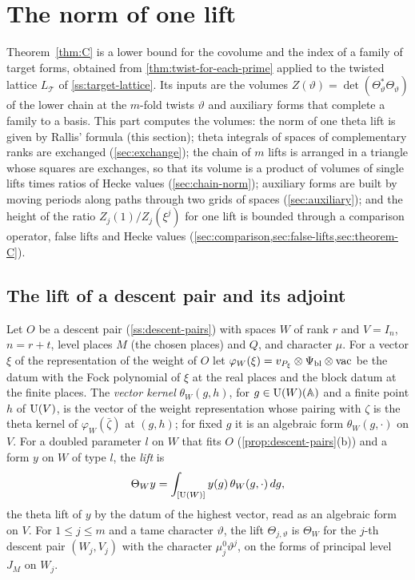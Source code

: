 \section{The norm of one lift}\label{sec:one-lift-norm}

Theorem~\ref{thm:C} is a lower bound for the covolume and the index of a family of target forms, obtained from \cref{thm:twist-for-each-prime} applied to
the twisted lattice $L_{\mathcal T}$ of \cref{ss:target-lattice}. Its inputs are the volumes $Z(\vartheta)=\det(\Theta_\vartheta^*\Theta_\vartheta)$ of the lower chain at the
$m$-fold twists $\vartheta$ and auxiliary forms that complete a family to a basis. This part computes the volumes: the norm of one theta lift is given by
Rallis' formula (this section); theta integrals of spaces of complementary ranks are exchanged (\cref{sec:exchange}); the chain of $m$ lifts is
arranged in a triangle whose squares are exchanges, so that its volume is a product of volumes of single lifts times ratios of Hecke values
(\cref{sec:chain-norm}); auxiliary forms are built by moving periods along paths through two grids of spaces (\cref{sec:auxiliary}); and the height of
the ratio $Z_j(1)/Z_j(\xi^j)$ for one lift is bounded through a comparison operator, false lifts and Hecke values
(\cref{sec:comparison,sec:false-lifts,sec:theorem-C}).

\subsection{The lift of a descent pair and its adjoint}\label{ss:lift-adjoint}
Let $O$ be a descent pair (\cref{ss:descent-pairs}) with spaces $W$ of rank $r$ and $V=I_n$, $n=r+t$, level places $M$ (the chosen places) and $Q$, and
character $\mu$. For a vector $\xi$ of the representation of the weight of $O$ let $\varphi_W(\xi)=v_{P_\xi}\otimes\Psi_{\rm bl}\otimes\mathrm{vac}$ be the datum with the Fock
polynomial of $\xi$ at the real places and the block datum at the finite places. The \emph{vector kernel} $\theta_W(g,h)$, for $g\in\operatorname{U}(W)(\mathbb{A})$ and a finite
point $h$ of $\operatorname{U}(V)$, is the vector of the weight representation whose pairing with $\zeta$ is the theta kernel of $\varphi_W(\bar\zeta)$ at $(g,h)$; for fixed $g$
it is an algebraic form $\theta_W(g,\cdot)$ on $V$. For a doubled parameter $l$ on $W$ that fits $O$ (\cref{prop:descent-pairs}(b)) and a form $y$ on $W$ of
type $l$, the \emph{lift} is
\[
  \Theta_Wy=\int_{[\operatorname{U}(W)]}y(g)\,\theta_W(g,\cdot)\,dg,
\]
the theta lift of $y$ by the datum of the highest vector, read as an algebraic form on $V$. For $1\le j\le m$ and a tame character $\vartheta$, the lift
$\Theta_{j,\vartheta}$ is $\Theta_W$ for the $j$-th descent pair $(W_j,V_j)$ with the character $\mu^0_j\vartheta^j$, on the forms of principal level $J_M$ on $W_j$.

